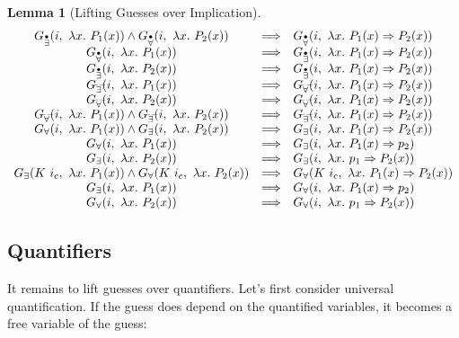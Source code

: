 \documentclass[a4paper,12pt,DIV=12,oneside]{scrbook}
\newtheorem{lemma}{Lemma}[section]
\theoremstyle{definition}
\theoremstyle{remark}
\newcommand{\GE}{\ensuremath{G_\exists}}
\newcommand{\GEP}{\ensuremath{G_{\accentset{\bullet}{\exists}}}}
\newcommand{\GEG}{\ensuremath{G_{\accentset{\_\,\_}{\exists}}}}
\newcommand{\GU}{\ensuremath{G_\forall}}
\newcommand{\GUP}{\ensuremath{G_{\accentset{\bullet}{\forall}}}}
\newcommand{\GUG}{\ensuremath{G_{\accentset{\_\,\_}{\forall}}}}
\begin{document}
\begin{lemma}[Lifting Guesses over Implication]\label{lemma_guesses_lift_imp}
\[
\begin{array}{c@{\quad}c@{\quad}l}
\GEP(i,\ \lambda x.\ P_1(x)) \wedge \GUP(i,\ \lambda x.\ P_2(x)) & \Longrightarrow & \GUP(i,\ \lambda x.\ P_1(x) \Rightarrow P_2(x)) \\
\GUP(i,\ \lambda x.\ P_1(x)) & \Longrightarrow & \GEP(i,\ \lambda x.\ P_1(x) \Rightarrow P_2(x)) \\
\GEP(i,\ \lambda x.\ P_2(x)) & \Longrightarrow & \GEP(i,\ \lambda x.\ P_1(x) \Rightarrow P_2(x)) \\

\GEG(i,\ \lambda x.\ P_1(x)) & \Longrightarrow & \GUG(i,\ \lambda x.\ P_1(x) \Rightarrow P_2(x)) \\
\GUG(i,\ \lambda x.\ P_2(x)) & \Longrightarrow & \GUG(i,\ \lambda x.\ P_1(x) \Rightarrow P_2(x)) \\
\GUG(i,\ \lambda x.\ P_1(x)) \wedge \GEG(i,\ \lambda x.\ P_2(x)) & \Longrightarrow & \GEG(i,\ \lambda x.\ P_1(x) \Rightarrow P_2(x)) \\

\GU(i,\ \lambda x.\ P_1(x)) \wedge \GE(i,\ \lambda x.\ P_2(x)) & \Longrightarrow & \GE(i,\ \lambda x.\ P_1(x) \Rightarrow P_2(x)) \\
\GU(i,\ \lambda x.\ P_1(x)) & \Longrightarrow & \GE(i,\ \lambda x.\ P_1(x) \Rightarrow p_2) \\
\GE(i,\ \lambda x.\ P_2(x)) & \Longrightarrow & \GE(i,\ \lambda x.\ p_1 \Rightarrow P_2(x)) \\

\GE(K\ i_c,\ \lambda x.\ P_1(x)) \wedge \GU(K\ i_c,\ \lambda x.\ P_2(x)) & \Longrightarrow & \GU(K\ i_c,\ \lambda x.\ P_1(x) \Rightarrow P_2(x)) \\
\GE(i,\ \lambda x.\ P_1(x)) & \Longrightarrow & \GU(i,\ \lambda x.\ P_1(x) \Rightarrow p_2) \\
\GU(i,\ \lambda x.\ P_2(x)) & \Longrightarrow & \GU(i,\ \lambda x.\ p_1 \Rightarrow P_2(x)) \\
\end{array}
\]
\end{lemma}


\subsection{Quantifiers}

It remains to lift guesses over quantifiers. Let's first consider universal quantification.
If the guess does depend on the quantified variables, it becomes a free variable of the guess:
\end{document}
